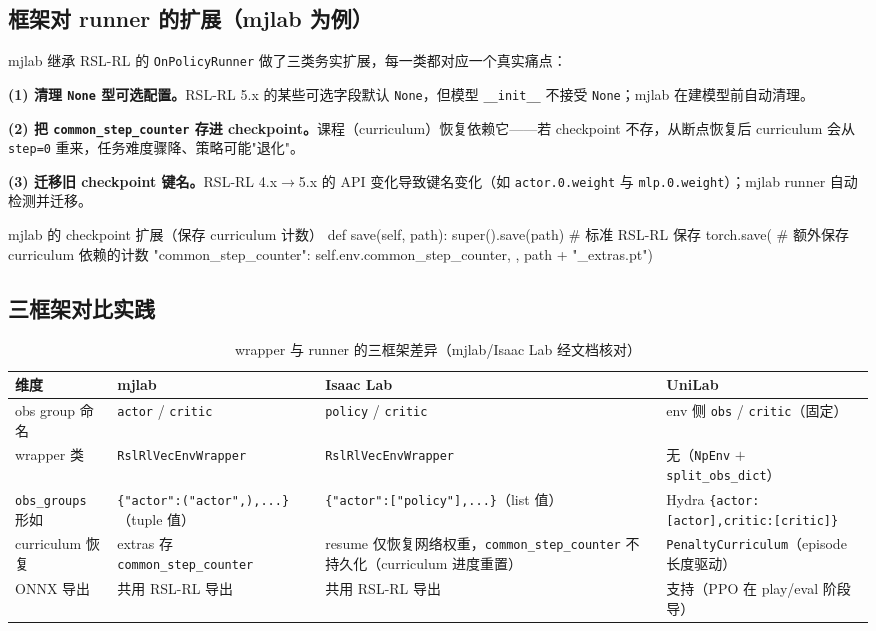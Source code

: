 \subsection{框架对 runner 的扩展（mjlab 为例）}

mjlab 继承 RSL-RL 的 \verb|OnPolicyRunner| 做了三类务实扩展，每一类都对应一个真实痛点：

\textbf{(1) 清理 \texttt{None} 型可选配置。}RSL-RL 5.x 的某些可选字段默认 \verb|None|，但模型 \verb|__init__| 不接受 \verb|None|；mjlab 在建模型前自动清理。

\textbf{(2) 把 \texttt{common\_step\_counter} 存进 checkpoint。}课程（curriculum）恢复依赖它——若 checkpoint 不存，从断点恢复后 curriculum 会从 \verb|step=0| 重来，任务难度骤降、策略可能"退化"。

\textbf{(3) 迁移旧 checkpoint 键名。}RSL-RL 4.x$\to$5.x 的 API 变化导致键名变化（如 \verb|actor.0.weight| 与 \verb|mlp.0.weight|）；mjlab runner 自动检测并迁移。

\begin{codebox}[Python]{mjlab 的 checkpoint 扩展（保存 curriculum 计数）}
def save(self, path):
    super().save(path)                       # 标准 RSL-RL 保存
    torch.save({                             # 额外保存 curriculum 依赖的计数
        "common_step_counter": self.env.common_step_counter,
    }, path + "_extras.pt")
\end{codebox}

\subsection{三框架对比实践}

\begin{table}[H]
\centering
\caption{wrapper 与 runner 的三框架差异（mjlab/Isaac Lab 经文档核对）}
\label{tab:rlmc-wrapper-3fw}
\begin{tabular}{llll}
\hline
维度 & mjlab & Isaac Lab & UniLab \\
\hline
obs group 命名 & \verb|actor| / \verb|critic| & \verb|policy| / \verb|critic| & env 侧 \verb|obs| / \verb|critic|（固定） \\
wrapper 类 & \verb|RslRlVecEnvWrapper| & \verb|RslRlVecEnvWrapper| & 无（\verb|NpEnv| $+$ \verb|split_obs_dict|） \\
\verb|obs_groups| 形如 & \verb|{"actor":("actor",),...}|（tuple 值） & \verb|{"actor":["policy"],...}|（list 值） & Hydra \verb|{actor:[actor],critic:[critic]}| \\
curriculum 恢复 & extras 存 \verb|common_step_counter| & resume 仅恢复网络权重，\verb|common_step_counter| 不持久化（curriculum 进度重置） & \verb|PenaltyCurriculum|（episode 长度驱动） \\
ONNX 导出 & 共用 RSL-RL 导出 & 共用 RSL-RL 导出 & 支持（PPO 在 play/eval 阶段导） \\
\hline
\end{tabular}
\end{table}

